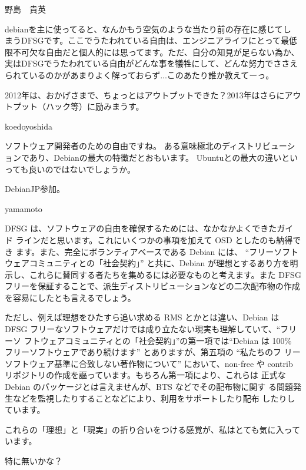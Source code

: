 \begin{prework}{ 野島　貴英 }

 debianを主に使ってると、なんかもう空気のような当たり前の存在に感じてし
 まうDFSGです。ここでうたわれている自由は、エンジニアライフにとって最低
 限不可欠な自由だと個人的には思ってます。ただ、自分の知見が足らない為か、
 実はDFSGでうたわれている自由がどんな事を犠牲にして、どんな努力でささえ
 られているのかがあまりよく解っておらず...このあたり誰か教えてーっ。


 2012年は、おかげさまで、ちょっとはアウトプットできた？2013年はさらにアウトプット（ハック等）に励みまうす。
\end{prework}

\begin{prework}{ koedoyoshida }


ソフトウェア開発者のための自由ですね。
ある意味極北のディストリビューションであり、Debianの最大の特徴だとおもいます。
Ubuntuとの最大の違いといっても良いのではないでしょうか。


DebianJP参加。
\end{prework}

\begin{prework}{ yamamoto }

DFSG は、ソフトウェアの自由を確保するためには、なかなかよくできたガイド
 ラインだと思います。これにいくつかの事項を加えて OSD としたのも納得でき
 ます。また、完全にボランティアベースである Debian には、 ``フリーソフト
 ウェアコミュニティとの「社会契約」'' と共に、Debian が理想とするあり方を明示し、これらに賛同する者たちを集めるには必要なものと考えます。また DFSG フリーを保証することで、派生ディストリビューションなどの二次配布物の作成を容易にしたとも言えるでしょう。

ただし、例えば理想をひたすら追い求める RMS とかとは違い、Debian は DFSG
 フリーなソフトウェアだけでは成り立たない現実も理解していて、``フリーソ
 フトウェアコミュニティとの「社会契約」''の第一項では``Debian は 100\%
 フリーソフトウェアであり続けます'' とありますが、第五項の ``私たちのフ
 リーソフトウェア基準に合致しない著作物について'' において、non-free や
 contrib リポジトリの作成を謳っています。もちろん第一項により、これらは
 正式な Debian のパッケージとは言えませんが、BTS などでその配布物に関す
 る問題発生などを監視したりすることなどにより、利用をサポートしたり配布
 したりしています。 

これらの「理想」と「現実」の折り合いをつける感覚が、私はとても気に入っています。


特に無いかな？
\end{prework}

